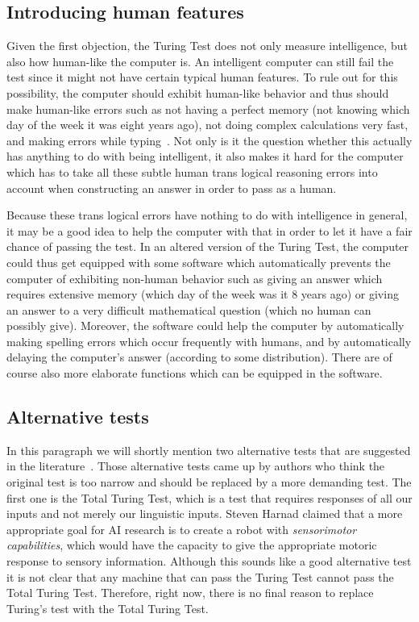 \subsection{Introducing human features}
Given the first objection, the Turing Test does not only measure intelligence, but also how human-like the computer is. An intelligent computer can still fail the test since it might not have certain typical human features. To rule out for this possibility, the computer should exhibit human-like behavior and thus should make human-like errors such as not having a perfect memory (not knowing which day of the week it was eight years ago), not doing complex calculations very fast, and making errors while typing~\cite{epstein2009parsing}. Not only is it the question whether this actually has anything to do with being intelligent, it also makes it hard for the computer which has to take all these subtle human trans logical reasoning errors into account when constructing an answer in order to pass as a human.

Because these trans logical errors have nothing to do with intelligence in general, it may be a good idea to help the computer with that in order to let it have a fair chance of passing the test. In an altered version of the Turing Test, the computer could thus get equipped with some software which automatically prevents the computer of exhibiting non-human behavior such as giving an answer which requires extensive memory (which day of the week was it 8 years ago) or giving an answer to a very difficult mathematical question (which no human can possibly give). Moreover, the software could help the computer by automatically making spelling errors which occur frequently with humans, and by automatically delaying the computer's answer (according to some distribution). There are of course also more elaborate functions which can be equipped in the software.


\subsection{Alternative tests}
In this paragraph we will shortly mention two alternative tests that are suggested in the literature~\cite{sep-turing-test}. Those alternative tests came up by authors who think the original test is too narrow and should be replaced by a more demanding test. The first one is the Total Turing Test, which is a test that requires responses of all our inputs and not merely our linguistic inputs. Steven Harnad claimed that a more appropriate goal for AI research is to create a robot with \textit{sensorimotor capabilities}, which would have the capacity to give the appropriate motoric response to sensory information. Although this sounds like a good alternative test it is not clear that any machine that can pass the Turing Test cannot pass the Total Turing Test. Therefore, right now, there is no final reason to replace Turing's test with the Total Turing Test.


